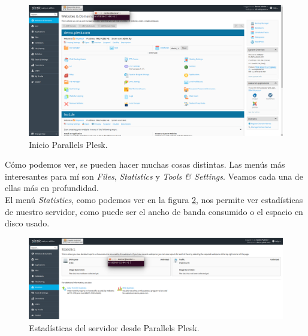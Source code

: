 \documentclass[a4paper,titlepage,12pt]{scrartcl}	%
\numberwithin{figure}{section} %
\numberwithin{table}{section} %
\begin{document}
	\begin{figure}[H]
		\includegraphics[width=\linewidth]{./Imagenes/14-inicio.png}
		\vspace{-0.5cm}
		\caption[Inicio Parallels Plesk.]{Inicio Parallels Plesk.}
		\label{14-inicio}
	\end{figure}
	
	Cómo podemos ver, se pueden hacer muchas cosas distintas. Las menús más interesantes para mí son \textit{Files}, \textit{Statistics} y \textit{Tools \& Settings}. Veamos cada una de ellas más en profundidad. \\
	
	El menú \textit{Statistics}, como podemos ver en la figura \ref{14-statistics}, nos permite ver estadísticas de nuestro servidor, como puede ser el ancho de banda consumido o el espacio en disco usado.
	\begin{figure}[H]
		\includegraphics[width=\linewidth]{./Imagenes/14-statistics.png}
		\vspace{-0.5cm}
		\caption[Estadísticas del servidor desde Parallels Plesk.]{Estadísticas del servidor desde Parallels Plesk.}
		\label{14-statistics}
	\end{figure}
	
\end{document}
